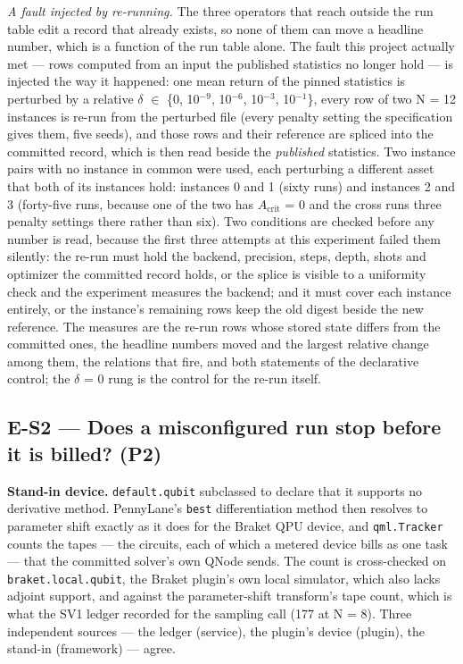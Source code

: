 \documentclass[acmsmall,screen,review]{acmart}
\begin{document}
\textit{A fault injected by re-running.} The three operators that reach outside the run table edit a record that already exists, so none of them can move a headline number, which is a function of the run table alone. The fault this project actually met --- rows computed from an input the published statistics no longer hold --- is injected the way it happened: one mean return of the pinned statistics is perturbed by a relative $\delta$ $\in$ \{0, 10$^{-9}$, 10$^{-6}$, 10$^{-3}$, 10$^{-1}$\}, every row of two N = 12 instances is re-run from the perturbed file (every penalty setting the specification gives them, five seeds), and those rows and their reference are spliced into the committed record, which is then read beside the \textit{published} statistics. Two instance pairs with no instance in common were used, each perturbing a different asset that both of its instances hold: instances 0 and 1 (sixty runs) and instances 2 and 3 (forty-five runs, because one of the two has $A_{\mathrm{crit}}$ = 0 and the cross runs three penalty settings there rather than six). Two conditions are checked before any number is read, because the first three attempts at this experiment failed them silently: the re-run must hold the backend, precision, steps, depth, shots and optimizer the committed record holds, or the splice is visible to a uniformity check and the experiment measures the backend; and it must cover each instance entirely, or the instance's remaining rows keep the old digest beside the new reference. The measures are the re-run rows whose stored state differs from the committed ones, the headline numbers moved and the largest relative change among them, the relations that fire, and both statements of the declarative control; the $\delta$ = 0 rung is the control for the re-run itself.


\subsection{E-S2 --- Does a misconfigured run stop before it is billed? (P2)}

\textbf{Stand-in device.} \texttt{default.qubit} subclassed to declare that it supports no derivative method. PennyLane's \texttt{best} differentiation method then resolves to parameter shift exactly as it does for the Braket QPU device, and \texttt{qml.Tracker} counts the tapes --- the circuits, each of which a metered device bills as one task --- that the committed solver's own QNode sends. The count is cross-checked on \texttt{braket.\allowbreak{}local.\allowbreak{}qubit}, the Braket plugin's own local simulator, which also lacks adjoint support, and against the parameter-shift transform's tape count, which is what the SV1 ledger recorded for the sampling call (177 at N = 8). Three independent sources --- the ledger (service), the plugin's device (plugin), the stand-in (framework) --- agree.
\end{document}
